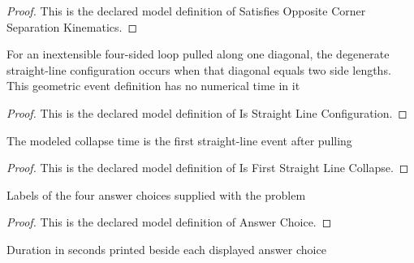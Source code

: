 \begin{proof}
  This is the declared model definition of Satisfies Opposite Corner Separation Kinematics.
\end{proof}
\begin{definition}
  \label{def:physics:phyx-mini-0884:phyxminiproblems-problemphyxmini0884-isstraightlineconfiguration}
  For an inextensible four-sided loop pulled along one diagonal, the degenerate straight-line configuration occurs when that diagonal equals two side lengths. This geometric event definition has no numerical time in it
\end{definition}
\begin{proof}
  This is the declared model definition of Is Straight Line Configuration.
\end{proof}
\begin{definition}
  \label{def:physics:phyx-mini-0884:phyxminiproblems-problemphyxmini0884-isfirststraightlinecollapse}
  The modeled collapse time is the first straight-line event after pulling
\end{definition}
\begin{proof}
  This is the declared model definition of Is First Straight Line Collapse.
\end{proof}
\begin{definition}
  \label{def:physics:phyx-mini-0884:phyxminiproblems-problemphyxmini0884-answerchoice}
  Labels of the four answer choices supplied with the problem
\end{definition}
\begin{proof}
  This is the declared model definition of Answer Choice.
\end{proof}
\begin{definition}
  \label{def:physics:phyx-mini-0884:phyxminiproblems-problemphyxmini0884-answerchoice-displayeddurationinseconds}
  Duration in seconds printed beside each displayed answer choice
\end{definition}
